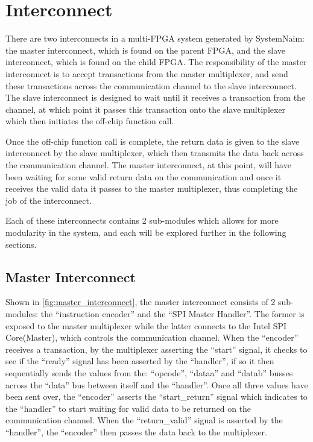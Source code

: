     

\section{Interconnect}
\label{sec:impl_interconnect}

There are two interconnects in a multi-FPGA system generated by SystemNaim: the master interconnect, which is found on the parent FPGA, and the slave interconnect, which is found on the child FPGA. The responsibility of the master interconnect is to accept transactions from the master multiplexer, and send these transactions across the communication channel to the slave interconnect. The slave interconnect is designed to wait until it receives a transaction from the channel, at which point it passes this transaction onto the slave multiplexer which then initiates the off-chip function call.

Once the off-chip function call is complete, the return data is given to the slave interconnect by the slave multiplexer, which then transmits the data back across the communication channel. The master interconnect, at this point, will have been waiting for some valid return data on the communication and once it receives the valid data it passes to the master multiplexer, thus completing the job of the interconnect.

Each of these interconnects contains 2 sub-modules which allows for more modularity in the system, and each will be explored further in the following sections.

\subsection{Master Interconnect}

Shown in \autoref{fig:master_interconnect}, the master interconnect consists of 2 sub-modules: the “instruction encoder” and the “SPI Master Handler”. The former is exposed to the master multiplexer while the latter connects to the Intel SPI Core(Master), which controls the communication channel. When the “encoder” receives a transaction, by the multiplexer asserting the “start” signal, it checks to see if the “ready” signal has been asserted by the “handler”, if so it then sequentially sends the values from the: “opcode”, “dataa” and “datab” busses across the “data” bus between itself and the “handler”. Once all three values have been sent over, the “encoder” asserts the “start\_return” signal which indicates to the “handler” to start waiting for valid data to be returned on the communication channel. When the “return\_valid” signal is asserted by the “handler”, the “encoder” then passes the data back to the multiplexer.

